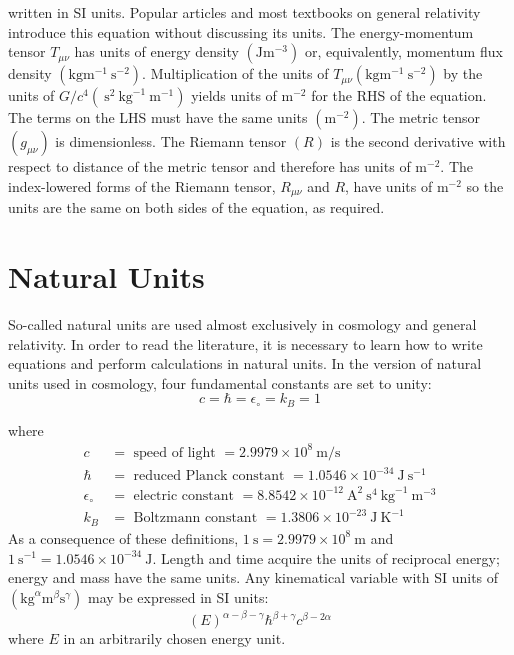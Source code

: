 \documentclass[main.tex]{subfiles}
\begin{document}
written in SI units. Popular articles and most textbooks on general relativity introduce this equation without discussing its units. The energy-momentum tensor $T_{\mu \nu}$ has units of energy density $\left(\mathrm{J} \mathrm{m}^{-3}\right)$ or, equivalently, momentum flux density $\left(\mathrm{kg} \mathrm{m}^{-1} \mathrm{~s}^{-2}\right)$. Multiplication of the units of $T_{\mu \nu}\left(\mathrm{kg} \mathrm{m}^{-1} \mathrm{~s}^{-2}\right)$ by the units of $G / c^4\left(\mathrm{~s}^2 \mathrm{~kg}^{-1} \mathrm{~m}^{-1}\right)$ yields units of $\mathrm{m}^{-2}$ for the RHS of the equation. The terms on the LHS must have the same units $\left(\mathrm{m}^{-2}\right)$. The metric tensor $\left(g_{\mu \nu}\right)$ is dimensionless. The Riemann tensor $(R)$ is the second derivative with respect to distance of the metric tensor and therefore has units of $\mathrm{m}^{-2}$. The index-lowered forms of the Riemann tensor, $R_{\mu \nu}$ and $R$, have units of $\mathrm{m}^{-2}$ so the units are the same on both sides of the equation, as required.

\section{Natural Units}
So-called natural units are used almost exclusively in cosmology and general relativity. In order to read the literature, it is necessary to learn how to write equations and perform calculations in natural units. In the version of natural units used in cosmology, four fundamental constants are set to unity:
$$
c=\hbar=\epsilon_{\circ}=k_B=1
$$

where
$$
\begin{aligned}
c & =\text { speed of light }=2.9979 \times 10^8 \mathrm{~m} / \mathrm{s} \\
\hbar & =\text { reduced Planck constant }=1.0546 \times 10^{-34} \mathrm{~J} \mathrm{~s}^{-1} \\
\epsilon_{\circ} & =\text { electric constant }=8.8542 \times 10^{-12} \mathrm{~A}^2 \mathrm{~s}^4 \mathrm{~kg}^{-1} \mathrm{~m}^{-3} \\
k_B & =\text { Boltzmann constant }=1.3806 \times 10^{-23} \mathrm{~J} \mathrm{~K}^{-1}
\end{aligned}
$$
As a consequence of these definitions, $1 \mathrm{~s}=2.9979 \times 10^8 \mathrm{~m}$ and $1 \mathrm{~s}^{-1}=1.0546 \times 10^{-34} \mathrm{~J}$. Length and time acquire the units of reciprocal energy; energy and mass have the same units. Any kinematical variable with SI units of $\left(\mathrm{kg}^\alpha \mathrm{m}^\beta \mathrm{s}^\gamma\right)$ may be expressed in SI units:
\begin{equation}
(E)^{\alpha-\beta-\gamma} \hbar^{\beta+\gamma} c^{\beta-2 \alpha}
\end{equation}
where $E$ in an arbitrarily chosen energy unit.
\end{document}
